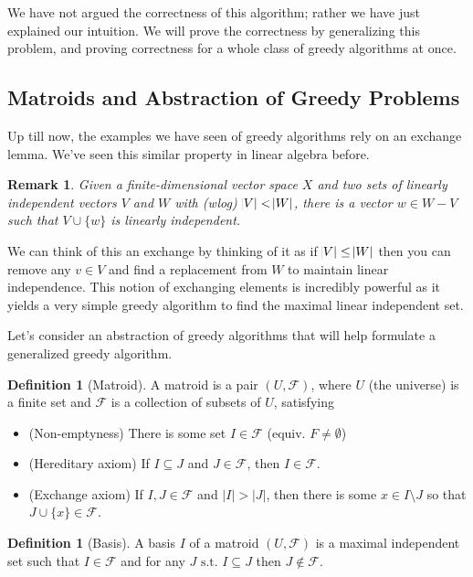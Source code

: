 \documentclass[10pt]{article}
\theoremstyle{plain}
\newtheorem{rmk}[thm]{Remark}
\theoremstyle{definition}
\newtheorem{defn}[thm]{Definition} %
\newcommand{\st}{\text{ s.t. }}
\numberwithin{equation}{section}
\numberwithin{figure}{section}
\begin{document}
\noindent We have not argued the correctness of this algorithm; rather we have just explained our intuition. We will prove the correctness by generalizing this problem, and proving correctness for a whole class of greedy algorithms at once.


\subsection{Matroids and Abstraction of Greedy Problems}
Up till now, the examples we have seen of greedy algorithms rely on an exchange lemma. We've seen this similar property in linear algebra before.

\begin{rmk}
Given a finite-dimensional vector space $X$ and two sets of linearly independent vectors $V$ and $W$ with (wlog) $\abs{V} < \abs{W}$, there is a vector $w \in W - V$ such that $V \cup \{w\}$ is linearly independent.
\end{rmk}

\noindent We can think of this an exchange by thinking of it as if $\abs{V} \leq \abs{W}$ then you can remove any $v \in V$ and find a replacement from $W$ to maintain linear independence. This notion of exchanging elements is incredibly powerful as it yields a very simple greedy algorithm to find the maximal linear independent set.

Let's consider an abstraction of greedy algorithms that will help formulate a generalized greedy algorithm. 

\begin{framed}
\begin{defn}[Matroid]
A {matroid} is a pair $(U, \mathcal{F})$, where $U$ (the universe) is a finite set and $\mathcal{F}$ is a collection of subsets of $U$, satisfying
\begin{itemize}
\item (Non-emptyness) There is some set $I \in \mathcal{F}$ (equiv. $F \neq \emptyset$)
\item (Hereditary axiom) If $I \subseteq J$ and $J \in \mathcal{F}$, then $I \in \mathcal{F}$.
\item (Exchange axiom) If $I, J \in \mathcal{F}$ and $|I| > |J|$, then there is some $x \in I \setminus J$ so that $J \cup \{x\} \in \mathcal{F}$.
\end{itemize}
\end{defn}

\begin{defn}[Basis]
A basis $I$ of a matroid $(U, \mathcal{F})$ is a maximal independent set such that $I \in \mathcal{F}$ and for any $J \st I \subseteq J$ then $J \notin \mathcal{F}$.
\end{defn}
\end{framed}
\end{document}
